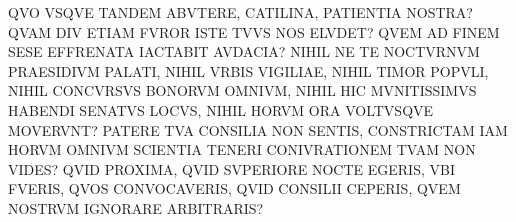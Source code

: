 \documentclass{article}
\begin{document}
\pagestyle{empty}
\ruscap
\setlength\baselineskip{1.5ex}
\setlength\lineskiplimit{-\maxdimen}

\noindent
\textcolor{Sepia}{QVO VSQVE TANDEM} ABVTERE, CATILINA, PATIENTIA NOSTRA?
QVAM DIV ETIAM FVROR ISTE TVVS NOS ELVDET?
QVEM AD FINEM SESE EFFRENATA IACTABIT AVDACIA?
NIHIL NE TE NOCTVRNVM PRAESIDIVM PALATI, NIHIL VRBIS VIGILIAE,
NIHIL TIMOR POPVLI, NIHIL CONCVRSVS BONORVM OMNIVM,
NIHIL HIC MVNITISSIMVS HABENDI SENATVS LOCVS,
NIHIL HORVM ORA VOLTVSQVE MOVERVNT?
PATERE TVA CONSILIA NON SENTIS,
CONSTRICTAM IAM HORVM OMNIVM SCIENTIA TENERI CONIVRATIONEM TVAM NON VIDES?
QVID PROXIMA, QVID SVPERIORE NOCTE EGERIS, VBI FVERIS, QVOS CONVOCAVERIS,
QVID CONSILII CEPERIS, QVEM NOSTRVM IGNORARE ARBITRARIS?
\end{document}
